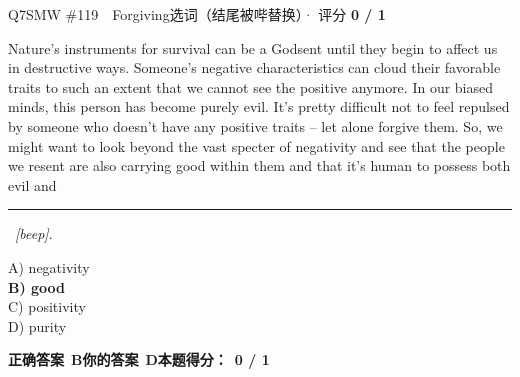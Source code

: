 \begin{qblock}{Q7\quad SMW \#119\ \ Forgiving}{选词（结尾被哔替换）· 评分 \textcolor{cAccent}{\bfseries 0 / 1}}
\begin{promptbox}
Nature's instruments for survival can be a Godsent until they begin to affect us in destructive ways. Someone's negative characteristics can cloud their favorable traits to such an extent that we cannot see the positive anymore. In our biased minds, this person has become purely evil. It's pretty difficult not to feel repulsed by someone who doesn't have any positive traits -- let alone forgive them. So, we might want to look beyond the vast specter of negativity and see that the people we resent are also carrying good within them and that it's human to possess both evil and \rule[0.3ex]{1.2cm}{0.4pt}\ \textit{[beep]}.
\end{promptbox}
{\small
A) negativity\\
{\color{cFix}\textbf{B) good}}\\
C) positivity\\
D) purity}
\par\smallskip
\textbf{正确答案}\ \textcolor{cFix}{\bfseries B}\qquad\textbf{你的答案}\ {\color{cWrong}\bfseries D}\qquad\textbf{本题得分：}\ {\color{cAccent}\bfseries 0 / 1}
\end{qblock}

